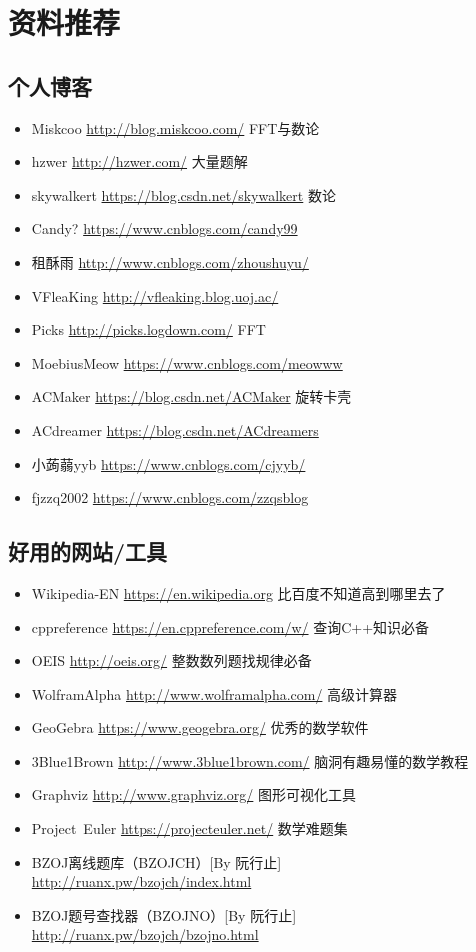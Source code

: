 \chapter{资料推荐}
\section{个人博客}
\begin{itemize}
	\item Miskcoo \url{http://blog.miskcoo.com/} FFT与数论
	\item hzwer \url{http://hzwer.com/} 大量题解
    \item skywalkert \url{https://blog.csdn.net/skywalkert} 数论
    \item Candy? \url{https://www.cnblogs.com/candy99}
    \item 租酥雨 \url{http://www.cnblogs.com/zhoushuyu/}
    \item VFleaKing \url{http://vfleaking.blog.uoj.ac/}
    \item Picks \url{http://picks.logdown.com/} FFT
    \item MoebiusMeow \url{https://www.cnblogs.com/meowww}
    \item ACMaker \url{https://blog.csdn.net/ACMaker} 旋转卡壳
    \item ACdreamer \url{https://blog.csdn.net/ACdreamers}
    \item 小蒟蒻yyb \url{https://www.cnblogs.com/cjyyb/}
    \item fjzzq2002 \url{https://www.cnblogs.com/zzqsblog}
\end{itemize}
\section{好用的网站/工具}
\begin{itemize}
    \item Wikipedia-EN \url{https://en.wikipedia.org} 比百度不知道高到哪里去了
    \item cppreference \url{https://en.cppreference.com/w/} 查询C++知识必备
    \item OEIS \url{http://oeis.org/} 整数数列题找规律必备
    \item WolframAlpha \url{http://www.wolframalpha.com/} 高级计算器
    \item GeoGebra \url{https://www.geogebra.org/} 优秀的数学软件
    \item 3Blue1Brown \url{http://www.3blue1brown.com/} 脑洞有趣易懂的数学教程
    \item Graphviz \url{http://www.graphviz.org/} 图形可视化工具
    \item Project~Euler \url{https://projecteuler.net/} 数学难题集
    \item BZOJ离线题库（BZOJCH）[By 阮行止] \\\url{http://ruanx.pw/bzojch/index.html}
    \item BZOJ题号查找器（BZOJNO）[By 阮行止]
    \url{http://ruanx.pw/bzojch/bzojno.html}
\end{itemize}
